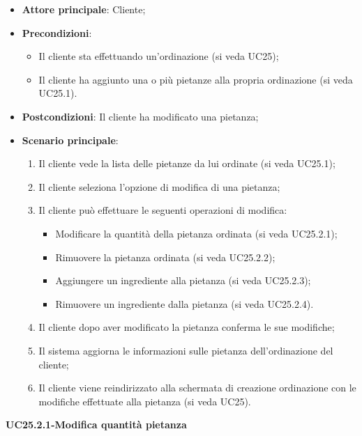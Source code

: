 \begin{itemize}
\item \textbf{Attore principale}: Cliente;
\item \textbf{Precondizioni}:
\begin{itemize}
\item Il cliente sta effettuando un'ordinazione (si veda UC25);
\item Il cliente ha aggiunto una o più pietanze alla propria ordinazione (si veda UC25.1).
\end{itemize}
\item \textbf{Postcondizioni}: Il cliente ha modificato una pietanza;
\item \textbf{Scenario principale}:
\begin{enumerate}
\item Il cliente vede la lista delle pietanze da lui ordinate (si veda UC25.1);
\item Il cliente seleziona l'opzione di modifica di una pietanza;
\item Il cliente può effettuare le seguenti operazioni di modifica:
\begin{itemize}
\item Modificare la quantità della pietanza ordinata (si veda UC25.2.1);
\item Rimuovere la pietanza ordinata (si veda UC25.2.2);
\item Aggiungere un ingrediente alla pietanza (si veda UC25.2.3);
\item Rimuovere un ingrediente dalla pietanza (si veda UC25.2.4).
\end{itemize}
\item Il cliente dopo aver modificato la pietanza conferma le sue modifiche;
\item Il sistema aggiorna le informazioni sulle pietanza dell'ordinazione del cliente;
\item Il cliente viene reindirizzato alla schermata di creazione ordinazione con le modifiche effettuate alla pietanza (si veda UC25).
\end{enumerate}
\end{itemize}

\textbf{UC25.2.1-Modifica quantità pietanza}

